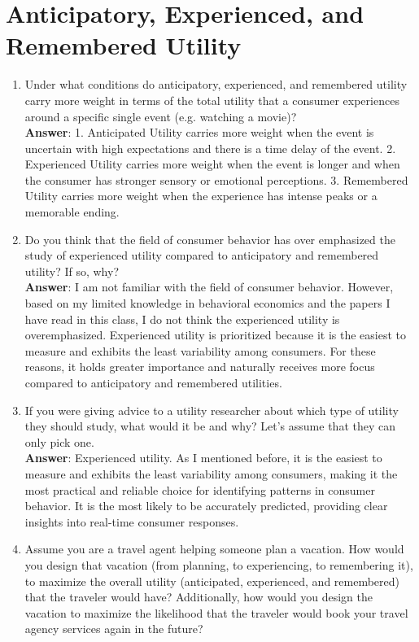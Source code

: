 \documentclass[11pt]{elegantbook}
\begin{document}
\chapter{Anticipatory, Experienced, and Remembered Utility}

\begin{enumerate}
    \item Under what conditions do anticipatory, experienced, and remembered utility carry more weight in terms of the total utility that a consumer experiences around a specific single event (e.g. watching a movie)?\\
    \textbf{Answer}: 1. Anticipated Utility carries more weight when the event is uncertain with high expectations and there is a time delay of the event. 2. Experienced Utility carries more weight when the event is longer and when the consumer has stronger sensory or emotional perceptions. 3. Remembered Utility carries more weight when the experience has intense peaks or a memorable ending.
    \item Do you think that the field of consumer behavior has over emphasized the study of experienced utility compared to anticipatory and remembered utility? If so, why?\\
    \textbf{Answer}: I am not familiar with the field of consumer behavior. However, based on my limited knowledge in behavioral economics and the papers I have read in this class, I do not think the experienced utility is overemphasized. Experienced utility is prioritized because it is the easiest to measure and exhibits the least variability among consumers. For these reasons, it holds greater importance and naturally receives more focus compared to anticipatory and remembered utilities.
    \item If you were giving advice to a utility researcher about which type of utility they should study, what would it be and why? Let’s assume that they can only pick one.\\
    \textbf{Answer}: Experienced utility. As I mentioned before, it is the easiest to measure and exhibits the least variability among consumers, making it the most practical and reliable choice for identifying patterns in consumer behavior. It is the most likely to be accurately predicted, providing clear insights into real-time consumer responses.
    \item Assume you are a travel agent helping someone plan a vacation. How would you design that vacation (from planning, to experiencing, to remembering it), to maximize the overall utility (anticipated, experienced, and remembered) that the traveler would have? Additionally, how would you design the vacation to maximize the likelihood that the traveler would book your travel agency services again in the future?

\end{enumerate}
\end{document}
